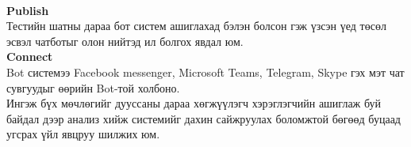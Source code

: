 \\\textbf{Publish}
\\Тестийн шатны дараа бот систем ашиглахад бэлэн болсон гэж үзсэн үед төсөл эсвэл чатботыг олон нийтэд ил болгох явдал юм. 
\\\textbf{Connect}
\\Bot системээ Facebook messenger, Microsoft Teams, Telegram, Skype гэх мэт чат сувгуудыг өөрийн Bot-той холбоно.
\\Ингэж бүх мөчлөгийг дууссаны дараа хөгжүүлэгч хэрэглэгчийн ашиглаж буй байдал дээр анализ хийж системийг дахин сайжруулах боломжтой бөгөөд буцаад угсрах үйл явцруу шилжих юм. 